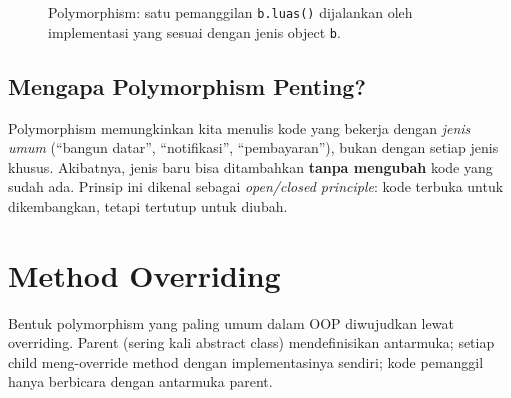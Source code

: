 \begin{figure}[htbp]
\centering
{}
\caption{Polymorphism: satu pemanggilan \texttt{b.luas()} dijalankan oleh implementasi yang sesuai dengan jenis object \texttt{b}.}
\end{figure}

\subsection{Mengapa Polymorphism Penting?}

Polymorphism memungkinkan kita menulis kode yang bekerja dengan \emph{jenis umum} (``bangun datar'', ``notifikasi'', ``pembayaran''), bukan dengan setiap jenis khusus. Akibatnya, jenis baru bisa ditambahkan \textbf{tanpa mengubah} kode yang sudah ada. Prinsip ini dikenal sebagai \emph{open/closed principle}: kode terbuka untuk dikembangkan, tetapi tertutup untuk diubah.

\section{Method Overriding}

Bentuk polymorphism yang paling umum dalam OOP diwujudkan lewat overriding. Parent (sering kali abstract class) mendefinisikan antarmuka; setiap child meng-override method dengan implementasinya sendiri; kode pemanggil hanya berbicara dengan antarmuka parent.

